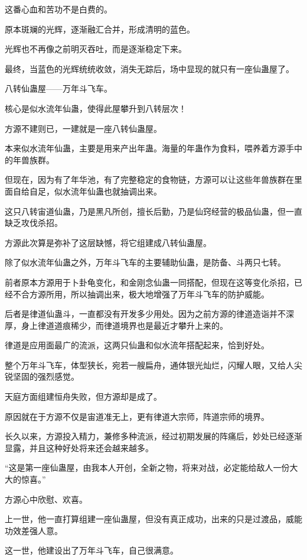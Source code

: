 \begin{this_body}
这番心血和苦功不是白费的。

原本斑斓的光辉，逐渐融汇合并，形成清明的蓝色。

光辉也不再像之前明灭吞吐，而是逐渐稳定下来。

最终，当蓝色的光辉统统收敛，消失无踪后，场中显现的就只有一座仙蛊屋了。

八转仙蛊屋——万年斗飞车。

核心是似水流年仙蛊，使得此屋攀升到八转层次！

方源不建则已，一建就是一座八转仙蛊屋。

本来似水流年仙蛊，主要是用来产出年蛊。海量的年蛊作为食料，喂养着方源手中的年兽族群。

但现在，因为有了年华池，有了完整稳定的食物链，方源可以让这些年兽族群在里面自给自足，似水流年仙蛊也就抽调出来。

这只八转宙道仙蛊，乃是黑凡所创，擅长后勤，乃是仙窍经营的极品仙蛊，但一直缺乏攻伐杀招。

方源此次算是弥补了这层缺憾，将它组建成八转仙蛊屋。

除了似水流年仙蛊之外，万年斗飞车的主要辅助仙蛊，是防备、斗两只七转。

前者原本方源用于卜卦龟变化，和金刚念仙蛊一同搭配，但现在这等变化杀招，已经不合方源所用，所以抽调出来，极大地增强了万年斗飞车的防护威能。

后者是律道仙蛊斗，一直都没有开发多少用处。因为之前方源的律道造诣并不深厚，身上律道道痕稀少，而律道境界也是最近才攀升上来的。

律道是应用面最广的流派，这两只仙蛊和似水流年搭配起来，恰到好处。

整个万年斗飞车，体型狭长，宛若一艘扁舟，通体银光灿烂，闪耀人眼，又给人尖锐坚固的强烈感觉。

天庭方面组建恒舟失败，但方源却是成了。

原因就在于方源不仅是宙道准无上，更有律道大宗师，阵道宗师的境界。

长久以来，方源投入精力，兼修多种流派，经过初期发展的阵痛后，妙处已经逐渐显露，并且这种好处将来还会越来越多。

“这是第一座仙蛊屋，由我本人开创，全新之物，将来对战，必定能给敌人一份大大的惊喜。”

方源心中欣慰、欢喜。

上一世，他一直打算组建一座仙蛊屋，但没有真正成功，出来的只是过渡品，威能功效差强人意。

这一世，他建设出了万年斗飞车，自己很满意。


\end{this_body}

